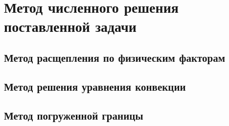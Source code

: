 \section{Метод численного решения поставленной задачи} \label{sect1_3}

\subsection{Метод расщепления по физическим факторам} \label{subsect1_3_1}

\subsection{Метод решения уравнения конвекции} \label{subsect1_3_2}

\subsection{Метод погруженной границы} \label{subsect1_3_3}

\clearpage
